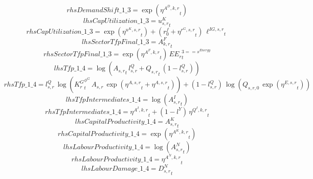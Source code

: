 \begin{dmath*}
rhsDemandShift\_1\_3 = \exp\left({{\eta^{A^{D},k,r}}}_{t}\right)
\end{dmath*}
\begin{dmath*}
lhsCapUtilization\_1\_3 = {{u^K_{s,r}}}_{t}
\end{dmath*}
\begin{dmath*}
rhsCapUtilization\_1\_3 = \exp\left({{\eta^{u^K,s,r}}}_{t}\right)+\left({{r^f_0}}+{{\eta^{r^G,s,r}}}_{t}\right)\, {{\ell^{IG,s,r}}}_{t}
\end{dmath*}
\begin{dmath*}
lhsSectorTfpFinal\_1\_3 = {{A^{F}_{k,r}}}_{t}
\end{dmath*}
\begin{dmath*}
rhsSectorTfpFinal\_1\_3 = \exp\left({{\eta^{A^F,k,r}}}_{t}\right)\, {{EE_r}}_{t}^{3=={{s^{Energy}}}}
\end{dmath*}
\begin{dmath*}
lhsTfp\_1\_4 = \log\left({{A_{s,r}}}_{t}\, {{l^{Q}_{s,r}}}+{{Q_{s,r}}}_{t}\, \left(1-{{l^{Q}_{s,r}}}\right)\right)
\end{dmath*}
\begin{dmath*}
rhsTfp\_1\_4 = {{l^{Q}_{s,r}}}\, \log\left({{K^G_{r}}}_{t}^{{{\phi^{G}}}}\, {{A_{s,r}}}\, \exp\left({{\eta^{A,s,r}}}_{t}+{{\eta^{A,s,r}}}_{t}\right)\right)+\left(1-{{l^{Q}_{s,r}}}\right)\, \log\left({{Q_{s,r,0}}}\, \exp\left({{\eta^{E,s,r}}}_{t}\right)\right)
\end{dmath*}
\begin{dmath*}
lhsTfpIntermediates\_1\_4 = \log\left({{A^{I}_{s,r}}}_{t}\right)
\end{dmath*}
\begin{dmath*}
rhsTfpIntermediates\_1\_4 = {{\eta^{A^{I},k,r}}}_{t}+\left(1-{{l^{Y}}}\right)\, {{\eta^{Q^{I},k,r}}}_{t}
\end{dmath*}
\begin{dmath*}
lhsCapitalProductivity\_1\_4 = {{A^{K}_{s,r}}}_{t}
\end{dmath*}
\begin{dmath*}
rhsCapitalProductivity\_1\_4 = \exp\left({{\eta^{A^{K},k,r}}}_{t}\right)
\end{dmath*}
\begin{dmath*}
lhsLabourProductivity\_1\_4 = \log\left({{A^{N}_{s,r}}}_{t}\right)
\end{dmath*}
\begin{dmath*}
rhsLabourProductivity\_1\_4 = {{\eta^{A^{N},k,r}}}_{t}
\end{dmath*}
\begin{dmath*}
lhsLabourDamage\_1\_4 = {{D^N_{s,r}}}_{t}
\end{dmath*}
